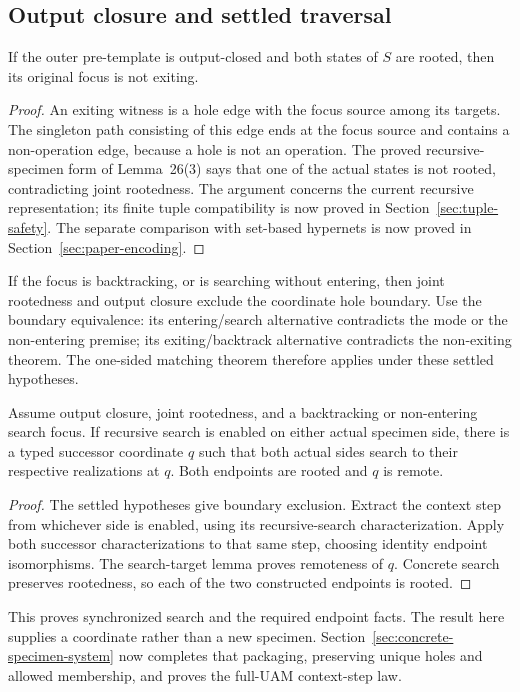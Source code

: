 \subsection{Output closure and settled traversal}
\begin{theorem}
If the outer pre-template is output-closed and both states of $S$ are rooted,
then its original focus is not exiting.
\end{theorem}
\begin{proof}
An exiting witness is a hole edge with the focus source among its targets.
The singleton path consisting of this edge ends at the focus source and
contains a non-operation edge, because a hole is not an operation. The proved
recursive-specimen form of Lemma~26(3) says that one of the actual states is
not rooted, contradicting joint rootedness. The argument concerns the current
recursive representation; its finite tuple compatibility is now proved in
Section~\ref{sec:tuple-safety}. The separate comparison with set-based
hypernets is now proved in Section~\ref{sec:paper-encoding}.
\end{proof}
If the focus is backtracking, or is searching without entering, then joint
rootedness and output closure exclude the coordinate hole boundary. Use the
boundary equivalence: its entering/search alternative contradicts the mode or
the non-entering premise; its exiting/backtrack alternative contradicts the
non-exiting theorem. The one-sided matching theorem therefore applies under
these settled hypotheses.
\begin{theorem}
Assume output closure, joint rootedness, and a backtracking or non-entering
search focus. If recursive search is enabled on either actual specimen side,
there is a typed successor coordinate $q$ such that both actual sides search to
their respective realizations at $q$. Both endpoints are rooted and $q$ is remote.
\end{theorem}
\begin{proof}
The settled hypotheses give boundary exclusion. Extract the context step from
whichever side is enabled, using its recursive-search characterization. Apply
both successor characterizations to that same step, choosing identity endpoint
isomorphisms. The search-target lemma proves remoteness of $q$. Concrete search
preserves rootedness, so each of the two constructed endpoints is rooted.
\end{proof}
This proves synchronized search and the required endpoint facts. The result
here supplies a coordinate rather than a new specimen. Section~\ref{sec:concrete-specimen-system}
now completes that packaging, preserving unique holes and allowed membership,
and proves the full-UAM context-step law.

